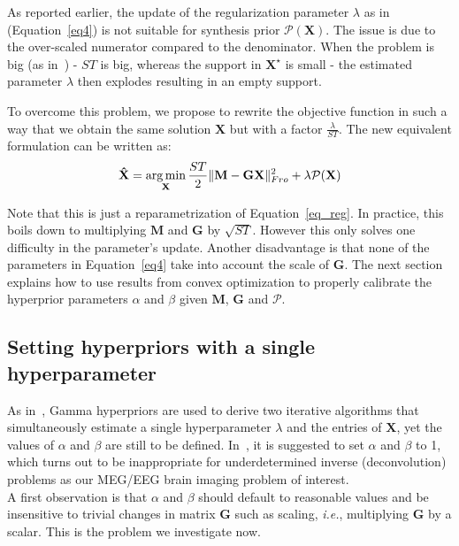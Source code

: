As reported earlier, the update of the regularization parameter $\lambda$ as in (Equation~\eqref{eq4}) is not suitable for synthesis prior $\mathcal{P}(\mathbf{X})$. The issue is due to the over-scaled numerator compared to the denominator. When the problem is big (as in~\cite{Figueiredo}) - $ST$ is big, whereas the support in $\mathbf{X}^\star$ is small - the estimated parameter $\lambda$ then explodes resulting in an empty support.

To overcome this problem, we propose to rewrite the objective function in such a way that we obtain the same solution $\mathbf{X}$ but with a factor $\frac{\lambda}{ST}$. The new equivalent formulation can be written as:
\begin{equation} \label{eq5}
    \mathbf{\hat{X}} = \mathop{\mathrm{arg}\,\mathrm{min}}_{\mathbf{X}} \frac{ST}{2}\|\mathbf{M - GX}\|^2_{Fro} + \lambda\mathcal{P}(\mathbf{X})
\end{equation}

Note that this is just a reparametrization of Equation~\eqref{eq_reg}. In practice, this boils down to multiplying $\mathbf{M}$ and $\mathbf{G}$ by $\sqrt{ST}$. However this only solves one difficulty in the parameter's update. Another disadvantage is that none of the parameters in Equation~\eqref{eq4} take into account the scale of $\mathbf{G}$. The next section explains how to use results from convex optimization to properly calibrate the hyperprior parameters $\alpha$ and $\beta$ given $\mathbf{M}$, $\mathbf{G}$ and $\mathcal{P}$.

\subsection{Setting hyperpriors with a single hyperparameter}
As in~\cite{Figueiredo}, Gamma hyperpriors are used to derive two iterative algorithms that simultaneously estimate a single hyperparameter $\lambda$ and the entries of $\mathbf{X}$, yet the values of $\alpha$ and $\beta$ are still to be defined.
In~\cite{Figueiredo}, it is suggested to set $\alpha$ and $\beta$ to 1, which turns out to be inappropriate for underdetermined inverse (deconvolution) problems as our MEG/EEG brain imaging problem of interest.\\

A first observation is that $\alpha$ and $\beta$ should default to reasonable values and be insensitive to trivial changes in matrix $\mathbf{G}$ such as scaling, \textit{i.e.}, multiplying $\mathbf{G}$ by a scalar. This is the problem we investigate now.

